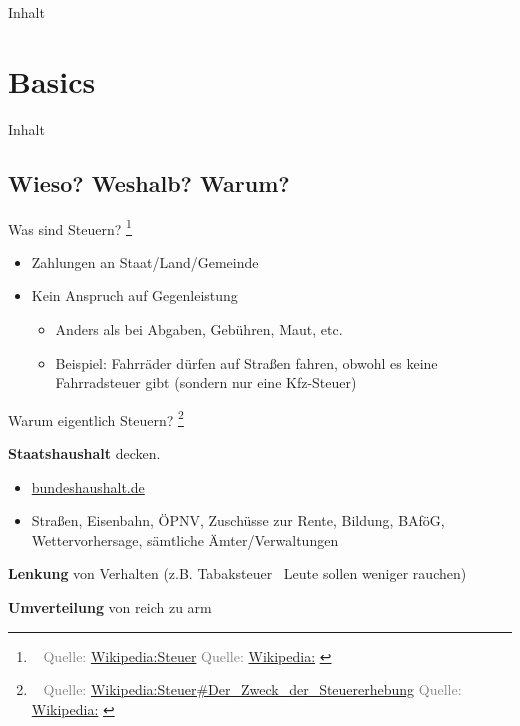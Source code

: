 \documentclass{beamer}
\let\oldfootnote\footnote
\renewcommand{\footnote}[1]
{%
	\oldfootnote
	{
		\tiny
		\textcolor{gray}{\ #1}
	}%
}
\newcommand{\citewiki}[2][]
{%
	\footnote
	{
		\ifthenelse{\isempty{#1}}
		{
			Quelle: \href{https://de.wikipedia.org/wiki/#2}{Wikipedia:#2}
		}
		{
			Quelle: \href{https://de.wikipedia.org/wiki/#2}{Wikipedia:#1}
		}
	}
}
\begin{document}
	\begin{frame}[t]{Inhalt}
		\tableofcontents[hidesubsections]
	\end{frame}
	
	\section{Basics}
	
		\begin{frame}[t]{Inhalt}
		\end{frame}
	
		\subsection{Wieso? Weshalb? Warum?}
	
			\begin{frame}{Was sind Steuern?\citewiki{Steuer}}
				\begin{itemize}
					\item Zahlungen an Staat/Land/Gemeinde
					\item Kein Anspruch auf Gegenleistung
					\begin{itemize}
						\item Anders als bei Abgaben, Gebühren, Maut, etc.
						\item Beispiel: Fahrräder dürfen auf Straßen fahren, obwohl es keine Fahrradsteuer gibt (sondern nur eine Kfz-Steuer)
					\end{itemize}
				\end{itemize}
			\end{frame}
		
			\begin{frame}{Warum eigentlich Steuern?\citewiki{Steuer\#Der\_Zweck\_der\_Steuererhebung}}
				\textbf{Staatshaushalt} decken.
				\begin{itemize}
					\item \href{https://www.bundeshaushalt.de/DE/Bundeshaushalt-digital/bundeshaushalt-digital.html}{bundeshaushalt.de}
					\item Straßen, Eisenbahn, ÖPNV, Zuschüsse zur Rente, Bildung, BAföG, Wettervorhersage, sämtliche Ämter/Verwaltungen
				\end{itemize}
			
				\textbf{Lenkung} von Verhalten (z.B. Tabaksteuer \textrightarrow\ Leute sollen weniger rauchen)
				
				\textbf{Umverteilung} von reich zu arm
			\end{frame}
		
\end{document}

